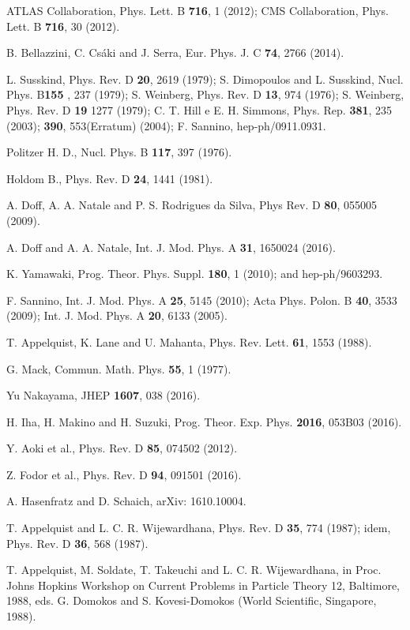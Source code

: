 \documentclass[preprint,amsmath,amssymb,superscriptaddress,showpacs,aps12pt]{revtex4}
\begin{document}
\begin{thebibliography}{00}

 ATLAS Collaboration, Phys. Lett. B {\bf 716}, 1 (2012); CMS Collaboration, Phys. Lett. B {\bf 716}, 30 (2012).

 B. Bellazzini, C. Csáki and J. Serra, Eur. Phys. J. C {\bf 74}, 2766 (2014).

 L. Susskind, Phys. Rev. D {\bf 20}, 2619 (1979); S. Dimopoulos and L. Susskind, Nucl. Phys. B{\bf 155 }, 237 (1979); S. Weinberg, Phys. Rev. D {\bf 13}, 974 (1976); S. Weinberg, Phys. Rev. D {\bf 19} 1277 (1979); C. T. Hill e E. H. Simmons,
Phys. Rep. {\bf 381}, 235 (2003); {\bf 390}, 553(Erratum) (2004); F. Sannino, hep-ph/0911.0931.

 Politzer H. D., Nucl. Phys. B {\bf 117}, 397 (1976). 

 Holdom B., Phys. Rev. D {\bf 24}, 1441 (1981).

 A. Doff, A. A. Natale and P. S. Rodrigues da Silva, Phys Rev. D {\bf 80}, 055005 (2009).

 A. Doff and A. A. Natale, Int. J. Mod. Phys. A {\bf 31}, 1650024 (2016).

 K. Yamawaki, Prog. Theor. Phys. Suppl. {\bf 180}, 1 (2010); and hep-ph/9603293.

 F. Sannino, Int. J. Mod. Phys. A {\bf 25}, 5145 (2010); Acta Phys. Polon. B {\bf 40}, 3533 (2009); Int. J. Mod. Phys. A {\bf 20}, 6133 (2005).

 T. Appelquist, K. Lane and U. Mahanta, Phys. Rev. Lett. {\bf 61}, 1553 (1988).

 G. Mack, Commun. Math. Phys. {\bf 55}, 1 (1977).

 Yu Nakayama, JHEP {\bf 1607}, 038 (2016).

 H. Iha, H. Makino and H. Suzuki, Prog. Theor. Exp. Phys. {\bf 2016}, 053B03 (2016).

 Y. Aoki et al., Phys. Rev. D {\bf 85}, 074502 (2012).

 Z. Fodor et al., Phys. Rev. D {\bf 94}, 091501 (2016).

 A. Hasenfratz and D. Schaich, arXiv: 1610.10004.

 T. Appelquist and L. C. R. Wijewardhana, Phys. Rev. D {\bf 35}, 774 (1987); idem, Phys. Rev. D {\bf 36}, 568 (1987).

 T. Appelquist, M. Soldate, T. Takeuchi and L. C. R. Wijewardhana, in Proc. Johns Hopkins Workshop on Current Problems in
Particle Theory 12, Baltimore, 1988, eds. G. Domokos and S. Kovesi-Domokos (World Scientific, Singapore, 1988).


\end{thebibliography}
\end{document}
